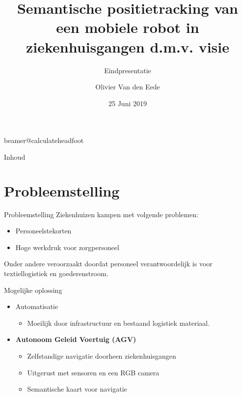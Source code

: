 \documentclass[11pt,t]{beamer}
\title[Eindpresentatie]{Semantische positietracking van een mobiele robot in ziekenhuisgangen d.m.v. visie} %
\subtitle{Eindpresentatie}
\author{Olivier Van den Eede}
\institute{KU Leuven - De Nayer}
\date{25 Juni 2019}
\begin{document}
\csname beamer@calculateheadfoot\endcsname %


\begin{frame}
	\titlepage
\end{frame}
	

\begin{frame}{Inhoud}
	\hfill	{\large \parbox{.961\textwidth}{\tableofcontents[hideothersubsections]}}
\end{frame}




\section{Probleemstelling}
\begin{frame}[fragile]{Probleemstelling}
	Ziekenhuizen kampen met volgende problemen:
	\begin{itemize}
		\item Personeelstekorten
		\item Hoge werkdruk voor zorgpersoneel
	\end{itemize}

	Onder andere veroorzaakt doordat personeel verantwoordelijk is voor textiellogistiek en goederenstroom.
\end{frame}

\begin{frame}[fragile]{Mogelijke oplossing}
	\begin{itemize}
		\item Automatisatie
		\begin{itemize}
			\item Moeilijk door infrastructuur en bestaand logistiek materiaal.
		\end{itemize}
		\item \textbf{Autonoom Geleid Voertuig (AGV)}
		\begin{itemize}
			\item Zelfstandige navigatie doorheen ziekenhuisgangen
			\item Uitgerust met sensoren en een RGB camera
			\item Semantische kaart voor navigatie
		\end{itemize}
	\end{itemize}
\end{frame}
\end{document}
